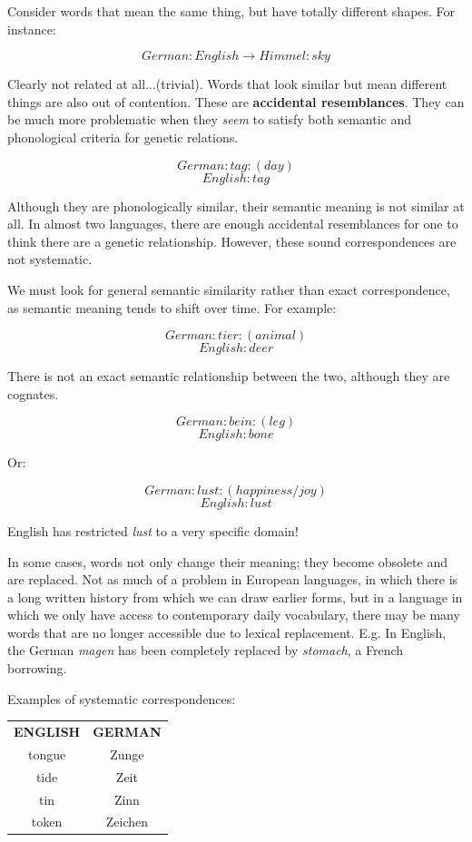 \documentclass{exam}
\begin{document}
Consider words that mean the same thing, but have totally different shapes. For instance:

$$German:English \rightarrow  Himmel:sky$$ 

Clearly not related at all...(trivial). Words that look similar but mean different things are also out of contention. These are \textbf{accidental resemblances}. They can be much more problematic when they \textit{seem} to satisfy both semantic and phonological criteria for genetic relations.

$$German: tag: (day)$$
$$English: tag$$

Although they are phonologically similar, their semantic meaning is not similar at all. In almost two languages, there are enough accidental resemblances for one to think there are a genetic relationship. However, these sound correspondences are not systematic. 

We must look for general semantic similarity rather than exact correspondence, as semantic meaning tends to shift over time. For example: 

$$German: tier: (animal)$$
$$English: deer$$

There is not an exact semantic relationship between the two, although they are cognates. 

$$German: bein: (leg)$$
$$English: bone$$

Or: 

$$German: lust: (happiness/joy)$$
$$English: lust$$

English has restricted \textit{lust} to a very specific domain!

In some cases, words not only change their meaning; they become obsolete and are replaced. Not as much of a problem in European languages, in which there is a long written history from which we can draw earlier forms, but in a language in which we only have access to contemporary daily vocabulary, there may be many words that are no longer accessible due to lexical replacement. E.g. In English, the German \textit{magen} has been completely replaced by \textit{stomach}, a French borrowing. 

Examples of systematic correspondences:
\begin{center}

\begin{tabular}{|c|c|} 

\textbf{ENGLISH} & \textbf{GERMAN}\\

tongue & Zunge\\
tide & Zeit\\
tin & Zinn\\
token & Zeichen\\


\end{tabular}
\end{center}
\end{document}
